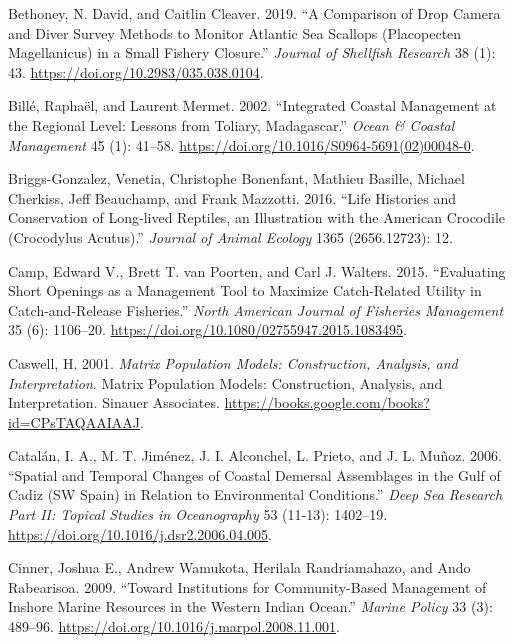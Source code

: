 \documentclass[
]{article}
\newlength{\cslhangindent}
\newlength{\cslentryspacingunit} %
\newenvironment{CSLReferences}[2] %
 {%
  \setlength{\parindent}{0pt}
  \ifodd #1
  \let\oldpar\par
  \def\par{\hangindent=\cslhangindent\oldpar}
  \fi
  \setlength{\parskip}{#2\cslentryspacingunit}
 }%
 {}
\begin{document}
\begin{CSLReferences}{1}{0}
\leavevmode{}%
Bethoney, N. David, and Caitlin Cleaver. 2019. {``A {Comparison} of {Drop} {Camera} and {Diver} {Survey} {Methods} to {Monitor} {Atlantic} {Sea} {Scallops} ({Placopecten} Magellanicus) in a {Small} {Fishery} {Closure}.''} \emph{Journal of Shellfish Research} 38 (1): 43. \url{https://doi.org/10.2983/035.038.0104}.

\leavevmode{}%
Billé, Raphaël, and Laurent Mermet. 2002. {``Integrated Coastal Management at the Regional Level: Lessons from {Toliary}, {Madagascar}.''} \emph{Ocean \& Coastal Management} 45 (1): 41--58. \url{https://doi.org/10.1016/S0964-5691(02)00048-0}.

\leavevmode{}%
Briggs-Gonzalez, Venetia, Christophe Bonenfant, Mathieu Basille, Michael Cherkiss, Jeff Beauchamp, and Frank Mazzotti. 2016. {``Life Histories and Conservation of Long‐lived Reptiles, an Illustration with the {American} Crocodile ({Crocodylus} Acutus).''} \emph{Journal of Animal Ecology} 1365 (2656.12723): 12.

\leavevmode{}%
Camp, Edward V., Brett T. van Poorten, and Carl J. Walters. 2015. {``Evaluating {Short} {Openings} as a {Management} {Tool} to {Maximize} {Catch}-{Related} {Utility} in {Catch}-and-{Release} {Fisheries}.''} \emph{North American Journal of Fisheries Management} 35 (6): 1106--20. \url{https://doi.org/10.1080/02755947.2015.1083495}.

\leavevmode{}%
Caswell, H. 2001. \emph{Matrix Population Models: {Construction}, Analysis, and Interpretation}. Matrix Population Models: {Construction}, Analysis, and Interpretation. Sinauer Associates. \url{https://books.google.com/books?id=CPsTAQAAIAAJ}.

\leavevmode{}%
Catalán, I. A., M. T. Jiménez, J. I. Alconchel, L. Prieto, and J. L. Muñoz. 2006. {``Spatial and Temporal Changes of Coastal Demersal Assemblages in the {Gulf} of {Cadiz} ({SW} {Spain}) in Relation to Environmental Conditions.''} \emph{Deep Sea Research Part II: Topical Studies in Oceanography} 53 (11-13): 1402--19. \url{https://doi.org/10.1016/j.dsr2.2006.04.005}.

\leavevmode{}%
Cinner, Joshua E., Andrew Wamukota, Herilala Randriamahazo, and Ando Rabearisoa. 2009. {``Toward Institutions for Community-Based Management of Inshore Marine Resources in the {Western} {Indian} {Ocean}.''} \emph{Marine Policy} 33 (3): 489--96. \url{https://doi.org/10.1016/j.marpol.2008.11.001}.


\end{CSLReferences}
\end{document}
